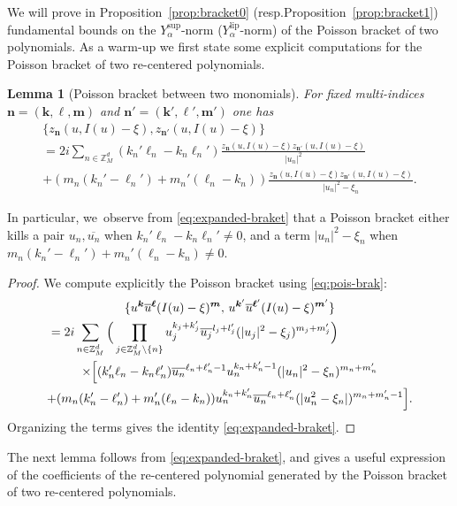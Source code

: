 \documentclass[10pt,a4paper]{amsart}
\providecommand{\resp}{resp.}
\theoremstyle{plain}
\newtheorem{lemma}[theorem]{Lemma}
\theoremstyle{definition}
\newcommand{\nb}{{\boldsymbol n}}
\newcommand{\kb}{{\boldsymbol k}}
\newcommand{\lb}{{\boldsymbol \ell}}
\newcommand{\mb}{{\boldsymbol m}}
\newcommand{\Z}{\mathbb{Z}}
\newcommand{\1}{\mathbf{1}}
\newcommand{\Ysup}[1]{Y_{#1}^{\mathrm{sup}}}
\newcommand{\Ylip}[1]{Y_{#1}^{\mathrm{lip}}}
\begin{document}
We will prove in Proposition~\ref{prop:bracket0} (\resp Proposition~\ref{prop:bracket1}) fundamental bounds on the $\Ysup{\alpha}$-norm ($\Ylip{\alpha}$-norm) of the Poisson bracket of two polynomials. As a warm-up we first state some explicit computations for the Poisson bracket of two re-centered polynomials.
\begin{lemma}[Poisson bracket between two monomials]
For fixed multi-indices $\nb=(\kb,\lb,\mb)$ and $\nb'=(\kb',\lb',\mb')$ one has
\begin{multline}
\label{eq:expanded-braket}
\{z_{\nb}(u,I(u)-\xi),z_{\nb'}(u,I(u)-\xi)\}\\
= 2i\sum_{n\in\Z_{M}^{d}}
(k_n'\ell_n-k_n\ell_n')
\frac{z_{\nb}(u,I(u)-\xi)z_{\nb'}(u,I(u)-\xi)}{|u_n|^2} \\
+
(m_n(k_n'-\ell_n')
+m_n'(\ell_n-k_n))
\frac{z_{\nb}(u,I(u)-\xi)z_{\nb'}(u,I(u)-\xi)}{|u_{n}|^{2}-\xi_{n}}.
\end{multline}
\end{lemma}
In particular, we~observe from \eqref{eq:expanded-braket} that a Poisson bracket either kills a pair $u_n,\overline{u_{n}}$ when $k_n'\ell_n-k_n\ell_n'\neq0$, and a term $|u_{n}|^{2}-\xi_{n}$ when $m_n(k_n'-\ell_n')+m_n'(\ell_n-k_n)\neq 0$.
\begin{proof}
We compute explicitly the Poisson bracket using \eqref{eq:pois-brak}:
\begin{multline*}
\{u^{\kb}\overline{u}^\lb(I(u)-\xi)^{\mb},\,
u^{\kb'}\overline{u}^{\lb'}(I(u)-\xi)^{\mb'}
\} \\\hspace*{-2cm}
=2i\sum_{n\in\Z_{M}^{d}}
\Big(
\prod_{j\in\Z_{M}^{d}\setminus\{n\}}
u_j^{k_j+k_j'}
\overline{u_{j}}^{l_j+l_j'}
(|u_{j}|^{2}-\xi_{j})^{m_j+m_j'}
\Big)\\
\times \Big[
(k_n'\ell_n-k_n\ell_n')
\overline{u_{n}}^{\ell_n+\ell_n'-1}
u_n^{k_n+k_n'-1}
(|u_{n}|^{2}-\xi_{n})^{m_n+m_n'}
\\
+ (m_n(k_n'-\ell_n')+m_n'(\ell_n-k_n))
u_n^{k_n+k_n'}
\overline{u_{n}}^{\ell_n+\ell_n'}
(|u_{n}^{2}-\xi_{n}|)^{m_n+m_n'-1}
\Big].
\end{multline*}
Organizing the terms gives the identity \eqref{eq:expanded-braket}.
\end{proof}
The next lemma follows from \eqref{eq:expanded-braket}, and gives a useful expression of the coefficients of the re-centered polynomial generated by the Poisson bracket of two re-centered polynomials.
\end{document}
